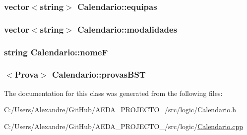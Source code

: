 \subsubsection[{equipas}]{\setlength{\rightskip}{0pt plus 5cm}vector$<$string$>$ Calendario\+::equipas\hspace{0.3cm}{\ttfamily [private]}}\label{class_calendario_a4c49ca003a72d9d1aa32fcef57066467}
\hypertarget{class_calendario_a6a492724444ed6b468fe230d09fd800b}{}
\subsubsection[{modalidades}]{\setlength{\rightskip}{0pt plus 5cm}vector$<$string$>$ Calendario\+::modalidades\hspace{0.3cm}{\ttfamily [private]}}\label{class_calendario_a6a492724444ed6b468fe230d09fd800b}
\hypertarget{class_calendario_ad14a413cc8b38380f6ea80f921cd16b4}{}
\subsubsection[{nome\+F}]{\setlength{\rightskip}{0pt plus 5cm}string Calendario\+::nome\+F\hspace{0.3cm}{\ttfamily [private]}}\label{class_calendario_ad14a413cc8b38380f6ea80f921cd16b4}
\hypertarget{class_calendario_a4caf77f388a6250cfb463e11ff869519}{}
\subsubsection[{provas\+B\+S\+T}]{$<${\bf Prova}$>$ Calendario\+::provas\+B\+S\+T\hspace{0.3cm}{\ttfamily [private]}}\label{class_calendario_a4caf77f388a6250cfb463e11ff869519}


The documentation for this class was generated from the following files\+:\begin{DoxyCompactItemize}
\item 
C\+:/\+Users/\+Alexandre/\+Git\+Hub/\+A\+E\+D\+A\+\_\+\+P\+R\+O\+J\+E\+C\+T\+O\+\_/src/logic/\hyperlink{_calendario_8h}{Calendario.\+h}\item 
C\+:/\+Users/\+Alexandre/\+Git\+Hub/\+A\+E\+D\+A\+\_\+\+P\+R\+O\+J\+E\+C\+T\+O\+\_/src/logic/\hyperlink{_calendario_8cpp}{Calendario.\+cpp}\end{DoxyCompactItemize}
